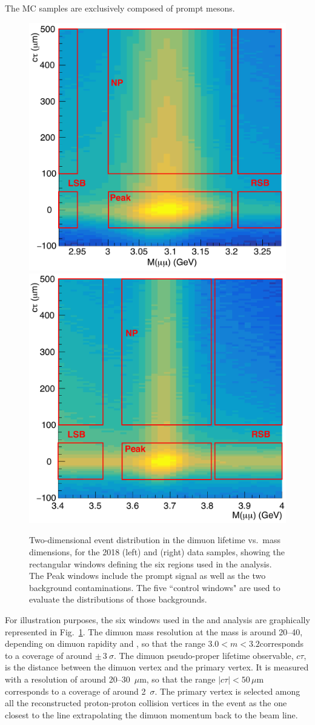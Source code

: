 The MC samples are exclusively composed of prompt \jpsi mesons.

\begin{figure}[ht]
\centering
\includegraphics[width=0.45\linewidth]{Figures/chapter2/2D_map_ctau_vs_mass_jpsi_2018.pdf}
\includegraphics[width=0.45\linewidth]{Figures/chapter2/2D_map_ctau_vs_mass_psip_2018.pdf}
\caption{Two-dimensional event distribution in the dimuon lifetime vs.\ mass dimensions,
for the 2018 \jpsi (left) and \psip (right) data samples,
showing the rectangular windows defining the six regions used in the analysis.
The Peak windows include the prompt signal as well as the two background contaminations.
The five ``control windows" are used to evaluate the \abscosth distributions of those backgrounds.}
\label{fig:2D_ctau_vs_mass_map}
\end{figure}

For illustration purposes, the six windows used in the \jpsi and \psip analysis 
are graphically represented in Fig.~\ref{fig:2D_ctau_vs_mass_map}.
The dimuon mass resolution at the \jpsi mass is around 20--40\MeV, 
depending on dimuon rapidity and \pt, 
so that the range $3.0 < m < 3.2$\GeV corresponds to a coverage of around $\pm \,3~\sigma$.
The dimuon pseudo-proper lifetime observable, $c\tau$, is the distance between the dimuon vertex 
and the primary vertex. It is measured with a resolution of around 20--30~$\mu$m, 
so that the range $|c\tau| < 50\,\mu$m corresponds to a coverage of around 2~$\sigma$.
The primary vertex is selected among all the reconstructed proton-proton collision vertices in the event 
as the one closest to the line extrapolating the dimuon momentum back to the beam line.

